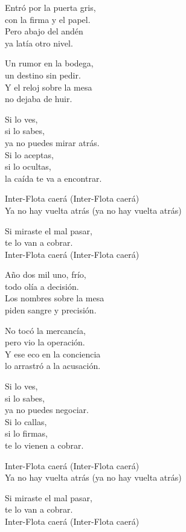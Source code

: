 \begin{lyrics}
Entró por la puerta gris,\\
con la firma y el papel.\\
Pero abajo del andén\\
ya latía otro nivel.

Un rumor en la bodega,\\
un destino sin pedir.\\
Y el reloj sobre la mesa\\
no dejaba de huir.

Si lo ves,\\
si lo sabes,\\
ya no puedes mirar atrás.\\
Si lo aceptas,\\
si lo ocultas,\\
la caída te va a encontrar.

Inter-Flota caerá
(Inter-Flota caerá)\\
Ya no hay vuelta atrás
(ya no hay vuelta atrás)

Si miraste el mal pasar,\\
te lo van a cobrar.\\
Inter-Flota caerá
(Inter-Flota caerá)

Año dos mil uno, frío,\\
todo olía a decisión.\\
Los nombres sobre la mesa\\
piden sangre y precisión.

No tocó la mercancía,\\
pero vio la operación.\\
Y ese eco en la conciencia\\
lo arrastró a la acusación.

Si lo ves,\\
si lo sabes,\\
ya no puedes negociar.\\
Si lo callas,\\
si lo firmas,\\
te lo vienen a cobrar.

Inter-Flota caerá
(Inter-Flota caerá)\\
Ya no hay vuelta atrás
(ya no hay vuelta atrás)

Si miraste el mal pasar,\\
te lo van a cobrar.\\
Inter-Flota caerá
(Inter-Flota caerá)


\end{lyrics}
